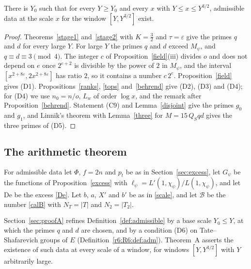 \begin{proposition}\label{dataexist}
There is $Y_0$ such that for every $Y\ge Y_0$ and every $x$ with $Y\le x\le Y^{3/2}$, admissible data at the scale $x$ for the window $[Y,Y^{3/2}]$ exist.
\end{proposition}

\begin{proof}
Theorems~\ref{stage1} and~\ref{stage2} with $K=\frac32$ and $\tau=\varepsilon$ give the primes $q$ and $d$ for every large $Y$. For large $Y$ the primes $q$ and $d$ exceed $M_\psi$, and $q\equiv d\equiv3\pmod4$. The integer $c$ of Proposition~\ref{field}(iii) divides $o$ and does not depend on $e$ once $2^{e+2}$ is divisible by the power of $2$ in $M_\psi$, and the interval $[x^{2+8\varepsilon},2x^{2+8\varepsilon}]$ has ratio $2$, so it contains a number $c\,2^e$. Proposition~\ref{field} gives (D1). Propositions~\ref{ranks}, \ref{tops} and~\ref{behrend} give (D2), (D3) and (D4); for (D4) we use $n_0=n/o$, $L_w$ of order $\log x$, and the remark after Proposition~\ref{behrend}. Statement (C9) and Lemma~\ref{disjoint} give the primes $g_0$ and $g_1$, and Linnik's theorem with Lemma~\ref{three} for $M=15\,Q_Sqd$ gives the three primes of (D5).
\end{proof}

\subsection{The arithmetic theorem}

For admissible data let $\Phi$, $f=2n$ and $p_t$ be as in Section~\ref{sec:excess}, let $G_\psi$ be the functions of Proposition~\ref{excess} with $\ell_\psi=L'(1,\chi_\psi)/L(1,\chi_\psi)$, and let $\mathrm{De}$ be the excess \eqref{De}. Let $b$, $a$, $X'$ and $b'$ be as in \eqref{scale}, and let $\mathcal B$ be the number \eqref{calB} with $N_T=\lvert T\rvert$ and $N_2=\lvert T_2\rvert$.

Section~\ref{sec:proofA} refines Definition~\ref{def:admissible} by a base scale $Y_0\le Y$, at which the primes $q$ and $d$ are chosen, and by a condition (D6) on Tate--Shafarevich groups of $E$ (Definition~\ref{r6:R6:def:adm}). Theorem~A asserts the existence of such data at every scale of a window, for windows $[Y,Y^{3/2}]$ with $Y$ arbitrarily large.

